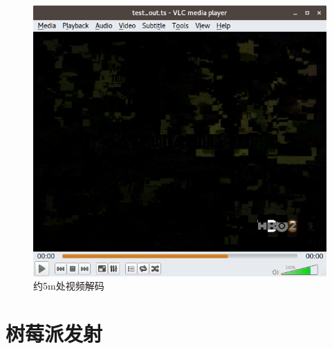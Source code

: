 		\begin{figure}[htp]
			\centering
			\includegraphics[width=13cm]{figures/dvbt_rx_TS_broken.png}
			\caption{约5m处视频解码}
			\label{fig:dvbt_rx_TS_broken}
		\end{figure}
	\section{树莓派发射}
